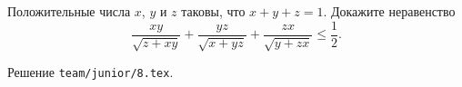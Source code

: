 \problem{}
Положительные числа $x$, $y$ и $z$ таковы, что $x + y + z = 1$.
Докажите неравенство
\[
    \frac{x y}{\sqrt{z + x y}}
    +
    \frac{y z}{\sqrt{x + y z}}
    +
    \frac{z x}{\sqrt{y + z x}}
\leq
    \frac{1}{2}
.\]

\solution Решение \texttt{team/junior/8.tex}.
\endproblem
